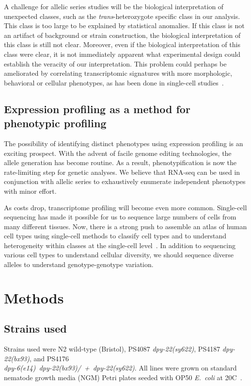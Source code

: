 \documentclass[10pt, twocolumn]{article}
\newcommand{\ecol}{\emph{E.~coli}}
\newcommand{\gene}[1]{\mbox{\emph{#1}}}
\begin{document}
A challenge for allelic series studies will be the biological interpretation of
unexpected classes, such as the \emph{trans}-heterozygote specific class in our
analysis. This class is too large to be explained by statistical anomalies.
If this class is not an artifact of background or strain construction, the
biological interpretation of this class is still not clear. Moreover, even if
the biological interpretation of this class were clear, it is not immediately
apparent what experimental design could establish the veracity of our
interpretation. This problem could perhaps be ameliorated by correlating
transcriptomic signatures with more morphologic, behavioral or cellular
phenotypes, as has been done in single-cell studies~\cite{Lane2017}.

\subsection*{Expression profiling as a method for phenotypic profiling}
The possibility of identifying distinct phenotypes using expression profiling is
an exciting prospect. With the advent of facile genome editing technologies, the
allele generation has become routine. As a result, phenotypification is now the
rate-limiting step for genetic analyses. We believe that RNA-seq can be used in
conjunction with allelic series to exhaustively enumerate independent phenotypes
with minor effort.

As costs drop, transcriptome profiling will become even more common.
Single-cell sequencing has made it possible for us to sequence large numbers of
cells from many different tissues. Now, there is a strong push to assemble an
atlas of human cell types using single-cell methods to classify cell types and
to understand heterogeneity within classes at the single-cell
level~\cite{Rozenblatt-Rosen2017}. In addition to sequencing various cell types
to understand cellular diversity, we should sequence diverse alleles to
understand genotype-genotype variation.

\section*{Methods}
\label{sec:methods}
\subsection*{Strains used}
Strains used were N2 wild-type (Bristol),
PS4087 \gene{dpy-22(sy622)},
PS4187 \gene{dpy-22(bx93)},
and PS4176\\ \gene{dpy-6(e14) dpy-22(bx93)/ + dpy-22(sy622)}.
All lines were grown on standard nematode growth media (NGM) Petri plates seeded
with OP50 \ecol{} at 20\degree{}C~\cite{Brenner1974}.
\end{document}
